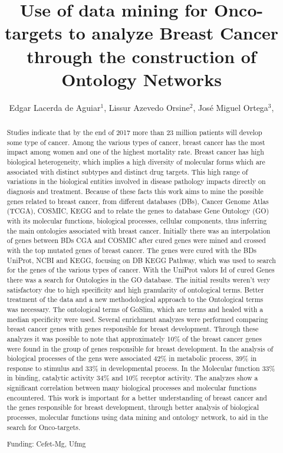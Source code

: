 \documentclass[twoside]{article}
\title{\vspace{-15mm}\fontsize{24pt}{10pt}\selectfont\textbf{ Use of data mining for Onco-targets to analyze Breast Cancer through the construction of Ontology Networks }} %
\author{ Edgar Lacerda de Aguiar$^{1}$, Lissur Azevedo Orsine$^{2}$, José Miguel Ortega$^{3}$, }
\affil{ 1 Cefet-MG

2 UFMG

3 Universidade Federal de Minas Gerais, Laboratório de Biodados

 }
\date{}
\begin{document}
  
  
  \maketitle %
  
  
  \thispagestyle{fancy} %
  
  
  \begin{abstract}
  Studies indicate that by the end of 2017 more than 23 million patients will develop some type of cancer. Among the various types of cancer, breast cancer has the most impact among women and one of the highest mortality rate. Breast cancer has high biological heterogeneity, which implies a high diversity of molecular forms which are associated with distinct subtypes and distinct drug targets. This high range of variations in the biological entities involved in disease pathology impacts directly on diagnosis and treatment. Because of these facts this work aims to mine the possible genes related to breast cancer, from different databases (DBs), Cancer Genome Atlas (TCGA), COSMIC, KEGG and to relate the genes to database Gene Ontology (GO) with its molecular functions, biological processes, cellular components, thus inferring the main ontologies associated with breast cancer. Initially there was an interpolation of genes between BDs CGA and COSMIC after cured genes were mined and crossed with the top mutated genes of breast cancer. The genes were cured with the BDs UniProt, NCBI and KEGG, focusing on DB KEGG Pathway, which was used to search for the genes of the various types of cancer. With the UniProt valors Id of cured Genes there was a search for Ontologies in the GO database. The initial results weren’t very satisfactory due to high specificity and high granularity of ontological terms. Better treatment of the data and a new methodological approach to the Ontological terms was necessary. The ontological terms of GoSlim, which are terms and healed with a median specificity were used. Several enrichment analyzes were performed comparing breast cancer genes with genes responsible for breast development. Through these analyzes it was possible to note that approximately 10\% of the breast cancer genes were found in the group of genes responsible for breast development. In the analysis of biological processes of the gens were associated 42\% in metabolic process, 39\% in response to stimulus and 33\% in developmental process. In the Molecular function 33\% in binding, catalytic activity 34\% and 10\% receptor activity. The analyzes show a significant correlation between many biological processes and molecular functions encountered. This work is important for a better understanding of breast cancer and the genes responsible for breast development, through better analysis of biological processes, molecular functions using data mining and ontology network, to aid in the search for Onco-targets.
  
  Funding: Cefet-Mg, Ufmg \\ 
  \end{abstract}
  
\end{document}
